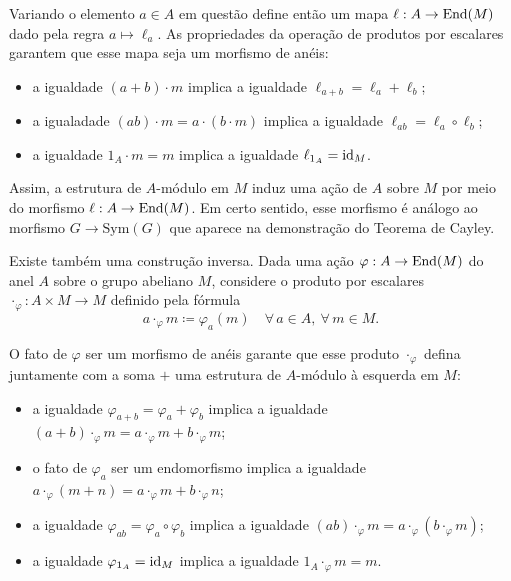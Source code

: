 Variando o elemento $a \in A$ em questão define então um mapa $\ell: A \to \mathrm{End}(M)$ dado pela regra $a \mapsto \ell_a$.
As propriedades da operação de produtos por escalares garantem que esse mapa seja um morfismo de anéis:
\begin{itemize}
\item a igualdade $(a+b) \cdot m$ implica a igualdade $\ell_{a+b} = \ell_a + \ell_b$;
  
\item a igualadade $(ab) \cdot m = a \cdot (b \cdot m)$ implica a igualdade $\ell_{ab} = \ell_a \circ \ell_b$;
  
\item a igualdade $1_A \cdot m = m$ implica a igualdade $\ell_{1_A} = \mathrm{id}_M$.
\end{itemize}

Assim, a estrutura de $A$-módulo em $M$ induz uma ação de $A$ sobre $M$ por meio do morfismo $\ell: A \to \mathrm{End}(M)$.
Em certo sentido, esse morfismo é análogo ao morfismo $G \to \mathrm{Sym}(G)$ que aparece na demonstração do Teorema de Cayley.

Existe também uma construção inversa.
Dada uma ação $\varphi: A \to \mathrm{End}(M)$ do anel $A$ sobre o grupo abeliano $M$, considere o produto por escalares $\cdot_\varphi: A \times M \to M$ definido pela fórmula
\begin{displaymath}
  a \cdot_{\varphi} m \coloneqq \varphi_a(m) \quad \forall\, a \in A, \ \forall\, m \in M.
\end{displaymath}

O fato de $\varphi$ ser um morfismo de anéis garante que esse produto $\cdot_\varphi$ defina juntamente com a soma $+$ uma estrutura de $A$-módulo à esquerda em $M$:
\begin{itemize}
\item a igualdade $\varphi_{a+b} = \varphi_a + \varphi_b$ implica a igualdade $(a+b) \cdot_\varphi m = a \cdot_\varphi m + b \cdot_\varphi m$;
  
\item o fato de $\varphi_a$ ser um endomorfismo implica a igualdade $a \cdot_\varphi (m+n) = a \cdot_\varphi m + b \cdot_\varphi n$;
  
\item a igualdade $\varphi_{ab} = \varphi_a \circ \varphi_b$ implica a igualdade $(ab) \cdot_\varphi m = a \cdot_\varphi (b \cdot_\varphi m)$;
  
\item a igualdade $\varphi_{1_A} = \mathrm{id}_M$ implica a igualdade $1_A \cdot_\varphi m = m$.
\end{itemize}


